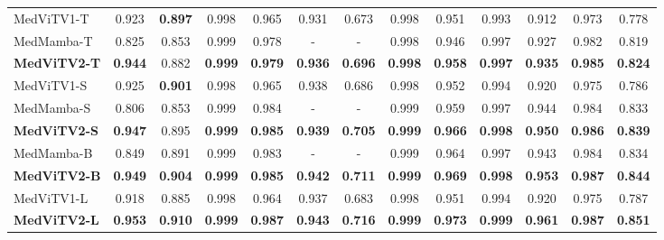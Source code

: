 \documentclass[times,twocolumn,final]{elsarticle}
\begin{document}
\begin{table*}[!htb]
\begin{center}
{\begin{tabular}{l||cc||cc||cc||cc||cc||cc}
            MedViTV1-T~\cite{manzari2023medvit}  &  {0.923} &  \textbf{0.897} &  {0.998} &  {0.965} & 0.931 & 0.673 &  {0.998} &  {0.951} & 0.993 & 0.912 & 0.973 & 0.778 \\
            MedMamba-T~\cite{yue2024medmamba} & 0.825 & 0.853 & 0.999 & 0.978 & -     & -     & 0.998 & 0.946 & 0.997 & 0.927 & 0.982 & 0.819\\
            \rowcolor{gray!20}
            \textbf{MedViTV2-T} & \textbf{0.944} & {0.882} & \textbf{0.999} & \textbf{0.979} & \textbf{0.936} & \textbf{0.696} & \textbf{0.998} & \textbf{0.958} & \textbf{0.997} & \textbf{0.935} & \textbf{0.985} & \textbf{0.824} \\
            \midrule

            MedViTV1-S~\cite{manzari2023medvit}  &  {0.925} &  \textbf{0.901} &   {0.998} &  {0.965} &  {0.938} &   {0.686} &  {0.998} &  {0.952} &   {0.994} &   {0.920} &   {0.975} &  0.786 \\
            MedMamba-S~\cite{yue2024medmamba} & 0.806 & 0.853 & 0.999 & 0.984 & - & - & 0.999 & 0.959 & 0.997 & 0.944 & 0.984 & 0.833\\
            \rowcolor{gray!20}
            \textbf{MedViTV2-S} &  \textbf{0.947} &  {0.895} & \textbf{0.999} & \textbf{0.985} & \textbf{0.939} & \textbf{0.705} & \textbf{0.999} & \textbf{0.966} & \textbf{0.998} & \textbf{0.950} & \textbf{0.986} & \textbf{0.839}\\
            \midrule

            MedMamba-B~\cite{yue2024medmamba} & 0.849 & 0.891 & 0.999 & 0.983 & - & - & 0.999 & 0.964 & 0.997 & 0.943 & 0.984 & 0.834 \\
            \rowcolor{gray!20}
            \textbf{MedViTV2-B} &  \textbf{0.949} &  \textbf{0.904} & \textbf{0.999} & \textbf{0.985} & \textbf{0.942} & \textbf{0.711} & \textbf{0.999} & \textbf{0.969} & \textbf{0.998} & \textbf{0.953} & \textbf{0.987} & \textbf{0.844}\\
            \midrule

            MedViTV1-L~\cite{manzari2023medvit}  & 0.918 & 0.885 &  {0.998} & 0.964 &  {0.937} &  {0.683} &  {0.998} & {0.951} &  {0.994} &  {0.920} &  {0.975} &  {0.787} \\
            \rowcolor{gray!20}
            \textbf{MedViTV2-L} & \textbf{0.953} &  \textbf{0.910} & \textbf{0.999} & \textbf{0.987} & \textbf{0.943} & \textbf{0.716} & \textbf{0.999} & \textbf{0.973} & \textbf{0.999} & \textbf{0.961} & \textbf{0.987} & \textbf{0.851}\\

            \bottomrule
        \end{tabular}}
    \end{center}
    \vspace{-15pt}
\end{table*}
\end{document}
